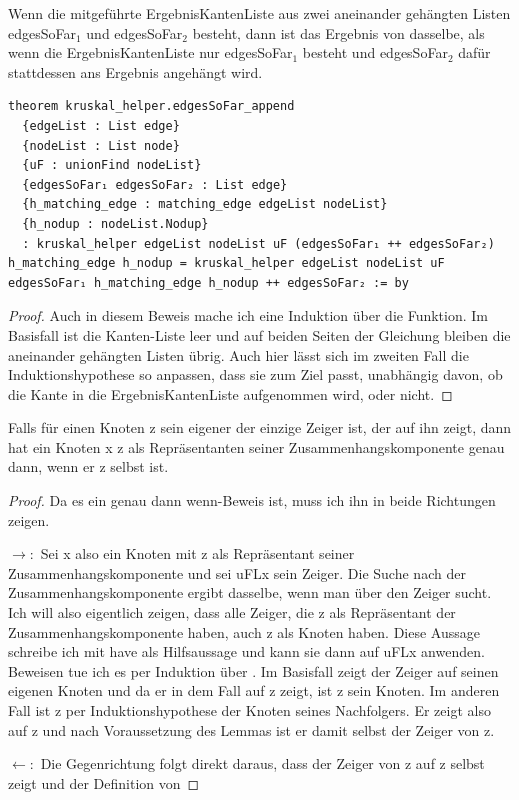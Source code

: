 \begin{lemma}[\KruskalkruskalhelperedgesSoFarappend]\label{KruskalkruskalhelperedgesSoFarappend}
  Wenn die mitgeführte ErgebnisKantenListe aus zwei aneinander gehängten Listen edgesSoFar$_1$ und edgesSo\-Far$_2$ besteht, dann ist das Ergebnis von \Kruskalkruskalhelper dasselbe,
  als wenn die ErgebnisKantenListe nur edgesSoFar$_1$ besteht und edgesSoFar$_2$ dafür stattdessen ans Ergebnis angehängt wird.
\end{lemma}
\begin{lstlisting}
theorem kruskal_helper.edgesSoFar_append
  {edgeList : List edge}
  {nodeList : List node}
  {uF : unionFind nodeList}
  {edgesSoFar₁ edgesSoFar₂ : List edge}
  {h_matching_edge : matching_edge edgeList nodeList}
  {h_nodup : nodeList.Nodup}
  : kruskal_helper edgeList nodeList uF (edgesSoFar₁ ++ edgesSoFar₂) h_matching_edge h_nodup = kruskal_helper edgeList nodeList uF edgesSoFar₁ h_matching_edge h_nodup ++ edgesSoFar₂ := by
\end{lstlisting}
\begin{proof}
  Auch in diesem Beweis mache ich eine Induktion über die Funktion.
  Im Basisfall ist die Kanten-Liste leer und auf beiden Seiten der Gleichung bleiben die aneinander gehängten Listen übrig.
  Auch hier lässt sich im zweiten Fall die Induktionshypothese so anpassen, dass sie zum Ziel passt, unabhängig davon, ob die Kante in die ErgebnisKantenListe aufgenommen wird,
  oder nicht.
\end{proof}



\begin{lemma}[\KruskalconnectedcomponentofunionFindofidnotcon]\label{KruskalconnectedcomponentofunionFindofidnotcon}
  Falls für einen Knoten z sein eigener der einzige Zeiger ist, der auf ihn zeigt, dann hat ein Knoten x z als Repräsentanten seiner Zusammenhangskomponente genau dann, wenn er z selbst ist.
\end{lemma}
\begin{proof}
  Da es ein \glqq genau dann wenn\grqq-Beweis ist, muss ich ihn in beide Richtungen zeigen.

  $\rightarrow:$
  Sei x also ein Knoten mit z als Repräsentant seiner Zusammenhangskomponente und sei uFLx sein Zeiger.
  Die Suche nach der Zusammenhangskomponente ergibt dasselbe, wenn man über den Zeiger sucht.
  Ich will also eigentlich zeigen, dass alle Zeiger, die z als Repräsentant der Zusammenhangskomponente haben, auch z als Knoten haben.
  Diese Aussage schreibe ich mit have als Hilfsaussage und kann sie dann auf uFLx anwenden.
  Beweisen tue ich es per Induktion über \KruskalconnectedcomponentofunionFindofunionFindLink.
  Im Basisfall zeigt der Zeiger auf seinen eigenen Knoten und da er in dem Fall auf z zeigt, ist z sein Knoten.
  Im anderen Fall ist z per Induktionshypothese der Knoten seines Nachfolgers.
  Er zeigt also auf z und nach Voraussetzung des Lemmas ist er damit selbst der Zeiger von z.

  $\leftarrow:$
  Die Gegenrichtung folgt direkt daraus, dass der Zeiger von z auf z selbst zeigt und der Definition von \KruskalconnectedcomponentofunionFindofid
\end{proof}



